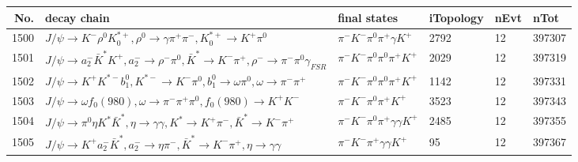 \begin{table}[htbp] 
\begin{center}
\begin{small}
\begin{tabular}{rlllll}\hline\hline
 No. & decay chain & final states &  iTopology & nEvt & nTot \\\hline
1500&$J/\psi       \rightarrow K^{-}          \rho^{0}      K_{0}^{*+}     , \rho^{0}       \rightarrow \gamma       \pi^{+}        \pi^{-}        , K_{0}^{*+}      \rightarrow K^{+}          \pi^{0}        $&$\pi^{-}        K^{-}          \pi^{0}        \pi^{+}        \gamma       K^{+}          $& 2792&   12&397307\\
1501&$J/\psi       \rightarrow a_{2}^{-}      \bar{K}^{*}   K^{+}          , a_{2}^{-}       \rightarrow \rho^{-}      \pi^{0}        , \bar{K}^{*}    \rightarrow K^{-}          \pi^{+}        , \rho^{-}       \rightarrow \pi^{-}        \pi^{0}        \gamma_{FSR} $&$\pi^{-}        K^{-}          \pi^{0}        \pi^{0}        \pi^{+}        K^{+}          $& 2029&   12&397319\\
1502&$J/\psi       \rightarrow K^{+}          K^{*-}         b_{1}^{0}      , K^{*-}          \rightarrow K^{-}          \pi^{0}        , b_{1}^{0}       \rightarrow \omega         \pi^{0}        , \omega          \rightarrow \pi^{-}        \pi^{+}        $&$\pi^{-}        K^{-}          \pi^{0}        \pi^{0}        \pi^{+}        K^{+}          $& 1142&   12&397331\\
1503&$J/\psi       \rightarrow \omega         f_{0}(980)     , \omega          \rightarrow \pi^{-}        \pi^{+}        \pi^{0}        , f_{0}(980)      \rightarrow K^{+}          K^{-}          $&$\pi^{-}        K^{-}          \pi^{0}        \pi^{+}        K^{+}          $& 3523&   12&397343\\
1504&$J/\psi       \rightarrow \pi^{0}        \eta          K^{*}          \bar{K}^{*}   , \eta           \rightarrow \gamma       \gamma       , K^{*}           \rightarrow K^{+}          \pi^{-}        , \bar{K}^{*}    \rightarrow K^{-}          \pi^{+}        $&$\pi^{-}        K^{-}          \pi^{0}        \pi^{+}        \gamma       \gamma       K^{+}          $& 2485&   12&397355\\
1505&$J/\psi       \rightarrow K^{+}          a_{2}^{-}      \bar{K}^{*}   , a_{2}^{-}       \rightarrow \eta          \pi^{-}        , \bar{K}^{*}    \rightarrow K^{-}          \pi^{+}        , \eta           \rightarrow \gamma       \gamma       $&$\pi^{-}        K^{-}          \pi^{+}        \gamma       \gamma       K^{+}          $&   95&   12&397367\\

\end{tabular}
\end{small}
\end{center}
\end{table}
